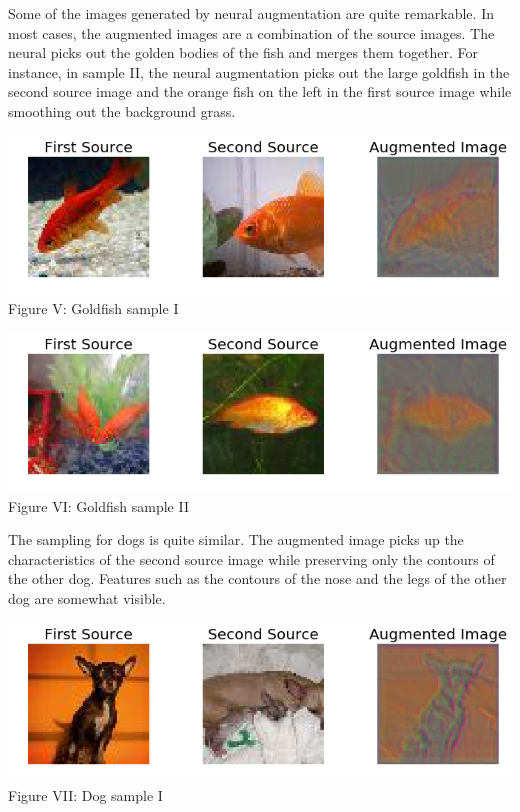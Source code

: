 \documentclass[10pt,twocolumn,letterpaper]{article}
\begin{document}
Some of the images generated by neural augmentation are quite remarkable. In most cases, the augmented images are a combination of the source images. The neural picks out the golden bodies of the fish and merges them together. For instance, in sample II, the neural augmentation picks out the large goldfish in the second source image and the orange fish on the left in the first source image while smoothing out the background grass.  

\begin{center}
\includegraphics[scale=0.33]{goldfish2}
Figure V: Goldfish sample I
\end{center}

\begin{center}
\includegraphics[scale=0.33]{goldfish1}
Figure VI: Goldfish sample II
\end{center}

The sampling for dogs is quite similar. The augmented image picks up the characteristics of the second source image while preserving only the contours of the other dog. Features such as the contours of the nose and the legs of the other dog are somewhat visible. 

\begin{center}
\includegraphics[scale=0.33]{dog1}
Figure VII: Dog sample I
\end{center}
\end{document}

